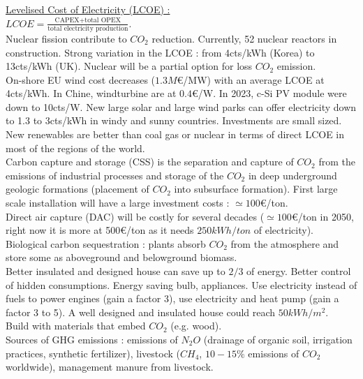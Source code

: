 \documentclass[../main.tex]{subfiles}
\begin{document}
\quad \underline{Levelised Cost of Electricity (LCOE) :}\\
$LCOE = \frac{\text{CAPEX+total OPEX}}{\text{total electricity production}} $.\\

Nuclear fission contribute to $CO_2$ reduction. Currently, 52 nuclear reactors in construction. Strong variation in the LCOE : from 4cts/kWh (Korea) to 13cts/kWh (UK). Nuclear will be a partial option for loss $CO_2$ emission. \\
On-shore EU wind cost decreases ($1.3M$€/MW) with an average LCOE at 4cts/kWh. In Chine, windturbine are at $0.4$€/W. In 2023, c-Si PV module were down to 10cts/W. New large solar and large wind parks can offer electricity down to 1.3 to 3cts/kWh in windy and sunny countries. Investments are small sized. New renewables are better than coal gas or nuclear in terms of direct LCOE in most of the regions of the world. \\

Carbon capture and storage (CSS) is the separation and capture of $CO_2$ from the emissions of industrial processes and storage of the $CO_2$ in deep underground geologic formations (placement of $CO_2$ into subsurface formation). First large scale installation will have a large investment costs : $\simeq 100$€/ton.\\
Direct air capture (DAC) will be costly for several decades ($\simeq 100$€/ton in 2050, right now it is more at 500€/ton as it needs $250kWh/ton$ of electricity).\\

Biological carbon sequestration : plants absorb $CO_2$ from the atmosphere and store some as aboveground and belowground biomass. \\

Better insulated and designed house can save up to $2/3$ of energy. Better control of hidden consumptions. Energy saving bulb, appliances. Use electricity instead of fuels to power engines (gain a factor 3), use electricity and heat pump (gain a factor 3 to 5). A well designed and insulated house could reach $50kWh/m^2$. \\
Build with materials that embed $CO_2$ (e.g. wood). \\
Sources of GHG emissions : emissions of $N_2O$ (drainage of organic soil, irrigation practices, synthetic fertilizer), livestock ($CH_4$, $10-15\%$ emissions of $CO_2$ worldwide), management manure from livestock. \\
\end{document}
